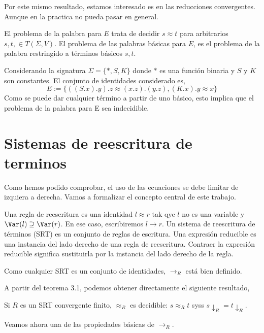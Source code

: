 Por este mismo resultado, estamos interesado es en las reducciones
convergentes. Aunque en la practica no pueda pasar en general.

\begin{defi}
  El problema de la palabra para $E$ trata de decidir $s \approx t$
  para arbitrarios $s,t, \in T(\Sigma, V)$. El problema de las
  palabras básicas para $E$, es el problema de la palabra restringido
  a términos básicos $s,t$.
\end{defi}

\begin{ejem}
  Considerando la signatura $\Sigma = \{*, S, K\}$ donde $*$ es una
  función binaria y $S$ y $K$ son constantes. El conjunto de
  identidades considerado es,
  \[E := \{((S.x).y).z \approx (x.z).(y.z),(K.x).y \approx x \} \]
  Como se puede dar cualquier término a partir de uno básico, esto
  implica que el problema de la palabra para E sea indecidible.
\end{ejem}

\section{Sistemas de reescritura de terminos}

Como hemos podido comprobar, el uso de las ecuaciones se debe limitar
de izquiera a derecha. Vamos a formalizar el concepto central de este
trabajo.

\begin{defi}
  Una regla de reescritura es una identidad $l \approx r$ tak qye $l$
  no es una variable y $\Var(l) \supseteq \Var(r)$. En ese caso,
  escribiremos $l \rightarrow r$. Un sistema de reescritura de
  términos (SRT) es un conjunto de reglas de escritura. Una expresión
  reducible es una instancia del lado derecho de una regla de
  reescritura. Contraer la expresión reducible significa sustituirla
  por la instancia del lado derecho de la regla.
\end{defi}

Como cualquier SRT es un conjunto de identidades, $\rightarrow_R$ está
bien definido.

A partir del teorema 3.1, podemos obtener directamente
el siguiente resultado,

\begin{teor}
  Si $R$ es un SRT convergente finito, $\approx_R$ es decidible: $s
  \approx_R t$ syss $s \downarrow_R = t \downarrow_R$.
\end{teor}

Veamos ahora una de las propiedades básicas de $\rightarrow_R$.

